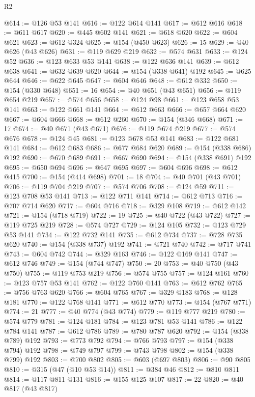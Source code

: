 \begin{lexlean}{R2}
\begin{coremodule}
{{{{{{{{{{{{{{{{{{{{{{{{{{{{{{{{{{{{{{{{{{{{{{{{{{{{{{{{{{{{{{{{{{{{{{{{{{{{{{{{{{{{{{{{{{{{@614 := @126 @53 @141
@616 := @122 @614 @141
@617 := @612 @616
@618 := @611 @617
@620 := @445 @602 @141
@621 := @618 @620
@622 := @604 @621
@623 := @612 @324
@625 := @154 (@450 @623)
@626 := 15
@629 := @40 @626 (@43 @626)
@631 := @119 @629 @219
@632 := @574 @631
@633 := @124 @52
@636 := @123 @633 @53 @141
@638 := @122 @636 @141
@639 := @612 @638
@641 := @632 @639 @620
@644 := @154 (@338 @641) @192
@645 := @625 @644
@646 := @622 @645
@647 := @604 @646
@648 := @612 @332
@650 := @154 (@330 @648)
@651 := 16
@654 := @40 @651 (@43 @651)
@656 := @119 @654 @219
@657 := @574 @656
@658 := @124 @98
@661 := @123 @658 @53 @141
@663 := @122 @661 @141
@664 := @612 @663
@666 := @657 @664 @620
@667 := @604 @666
@668 := @612 @260
@670 := @154 (@346 @668)
@671 := 17
@674 := @40 @671 (@43 @671)
@676 := @119 @674 @219
@677 := @574 @676
@678 := @124 @45
@681 := @123 @678 @53 @141
@683 := @122 @681 @141
@684 := @612 @683
@686 := @677 @684 @620
@689 := @154 (@338 @686) @192
@690 := @670 @689
@691 := @667 @690
@694 := @154 (@338 @691) @192
@695 := @650 @694
@696 := @647 @695
@697 := @604 @696
@698 := @612 @415
@700 := @154 (@414 @698)
@701 := 18
@704 := @40 @701 (@43 @701)
@706 := @119 @704 @219
@707 := @574 @706
@708 := @124 @59
@711 := @123 @708 @53 @141
@713 := @122 @711 @141
@714 := @612 @713
@716 := @707 @714 @620
@717 := @604 @716
@718 := @329 @108
@719 := @612 @142
@721 := @154 (@718 @719)
@722 := 19
@725 := @40 @722 (@43 @722)
@727 := @119 @725 @219
@728 := @574 @727
@729 := @124 @105
@732 := @123 @729 @53 @141
@734 := @122 @732 @141
@735 := @612 @734
@737 := @728 @735 @620
@740 := @154 (@338 @737) @192
@741 := @721 @740
@742 := @717 @741
@743 := @604 @742
@744 := @329 @163
@746 := @122 @169 @141
@747 := @612 @746
@749 := @154 (@744 @747)
@750 := 20
@753 := @40 @750 (@43 @750)
@755 := @119 @753 @219
@756 := @574 @755
@757 := @124 @161
@760 := @123 @757 @53 @141
@762 := @122 @760 @141
@763 := @612 @762
@765 := @756 @763 @620
@766 := @604 @765
@767 := @329 @183
@768 := @128 @181
@770 := @122 @768 @141
@771 := @612 @770
@773 := @154 (@767 @771)
@774 := 21
@777 := @40 @774 (@43 @774)
@779 := @119 @777 @219
@780 := @574 @779
@781 := @124 @181
@784 := @123 @781 @53 @141
@786 := @122 @784 @141
@787 := @612 @786
@789 := @780 @787 @620
@792 := @154 (@338 @789) @192
@793 := @773 @792
@794 := @766 @793
@797 := @154 (@338 @794) @192
@798 := @749 @797
@799 := @743 @798
@802 := @154 (@338 @799) @192
@803 := @700 @802
@805 := @603 (@697 @803)
@806 := @90 @805
@810 := @315 (@47 (@10 @53 @14))
@811 := @384 @46
@812 := @810 @811
@814 := @117 @811 @131
@816 := @155 @125 @107
@817 := 22
@820 := @40 @817 (@43 @817)
}}}}}}}}}}}}}}}}}}}}}}}}}}}}}}}}}}}}}}}}}}}}}}}}}}}}}}}}}}}}}}}}}}}}}}}}}}}}}}}}}}}}}}}}}}}}
\end{coremodule}
\end{lexlean}
